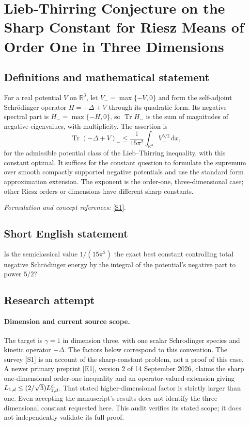 \documentclass[11pt]{article}
\begin{document}
\section*{\texorpdfstring{Lieb-Thirring Conjecture on the Sharp Constant for Riesz Means of Order One in Three Dimensions}{Lieb-Thirring Conjecture on the Sharp Constant for Riesz Means of Order One in Three Dimensions}}\label{386}
\subsection{Definitions and mathematical statement}
For a real potential $V$ on ${\mathbb{R}}^3$, let $V_- =\max\{-V,0\}$ and form the self-adjoint Schr\"odinger operator $H=-\Delta+V$ through its quadratic form. Its negative spectral part is $H_-=\max\{-H,0\}$, so $\operatorname{Tr}H_-$ is the sum of magnitudes of negative eigenvalues, with multiplicity. The assertion is
\[
 \operatorname{Tr}(-\Delta+V)_-\le
 \frac1{15\pi^2}\int_{{\mathbb{R}}^3}V_-^{5/2}{\,\mathrm{d}} x,
\]
for the admissible potential class of the Lieb--Thirring inequality, with this constant optimal. It suffices for the constant question to formulate the supremum over smooth compactly supported negative potentials and use the standard form approximation extension. The exponent is the order-one, three-dimensional case; other Riesz orders or dimensions have different sharp constants.
\par\smallskip\textit{Formulation and concept references:} \href{https://arxiv.org/abs/2007.09326}{[S1]}.

\subsection{Short English statement}
Is the semiclassical value $1/(15\pi^2)$ the exact best constant controlling total negative Schr\"odinger energy by the integral of the potential's negative part to power $5/2$?
\subsection{Research attempt}
\paragraph{Dimension and current source scope.}
The target is $\gamma=1$ in dimension three, with one scalar
Schrodinger species and kinetic operator $-\Delta$. The factors
below correspond to this convention. The survey [S1] is an account
of the sharp-constant problem, not a proof of this case. A newer
primary preprint [E1], version 2 of 14 September 2026, claims the
sharp one-dimensional order-one inequality and an operator-valued
extension giving $L_{1,d}\leq(2/\sqrt3)L_{1,d}^{\rm cl}$. That
stated higher-dimensional factor is strictly larger than one.
Even accepting the manuscript's results does not identify the
three-dimensional constant requested here. This audit verifies its
stated scope; it does not independently validate its full proof.
\end{document}
